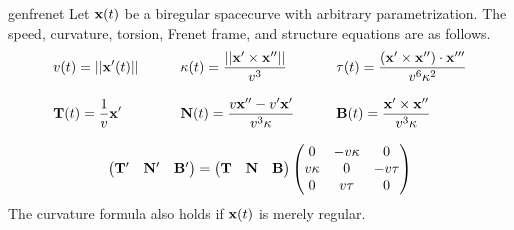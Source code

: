 \begin{cor}{}{genfrenet}
Let ${\mathbf{x}}(t)$ be a biregular spacecurve with arbitrary parametrization. The speed, curvature, torsion, Frenet frame, and structure equations are as follows.
\begin{gather*}
\begin{aligned}
&v(t)=\left| \left| {\mathbf{x}}'(t)\right|\right|\qquad
&&\kappa(t)=\frac{\left| \left| {\mathbf{x}}'\times{\mathbf{x}}''\right|\right|}{v^3}\qquad
&&\tau(t)=\frac{({\mathbf{x}}'\times{\mathbf{x}}'')\cdot{\mathbf{x}}'''}{v^6\kappa^2}\\[8pt]
&{\mathbf{T}}(t)=\frac 1v{\mathbf{x}}'\qquad
&&{\mathbf{N}}(t)=\frac{v{\mathbf{x}}''-v'{\mathbf{x}}'}{v^3\kappa}\qquad
&&{\mathbf{B}}(t)=\frac{{\mathbf{x}}'\times{\mathbf{x}}''}{v^3\kappa}
\end{aligned}\\[8pt]
\begin{pmatrix}
  {\mathbf{T}}'&{\mathbf{N}}'&{\mathbf{B}}'
  \end{pmatrix}=
	\begin{pmatrix}
	{\mathbf{T}}&{\mathbf{N}}&{\mathbf{B}}
	\end{pmatrix}
	\begin{pmatrix}
	0&-v\kappa &0\\v\kappa&0&-v\tau\\0&v\tau&0
	\end{pmatrix}
	\end{gather*}
	The curvature formula also holds if ${\mathbf{x}}(t)$ is merely regular.
\end{cor}




